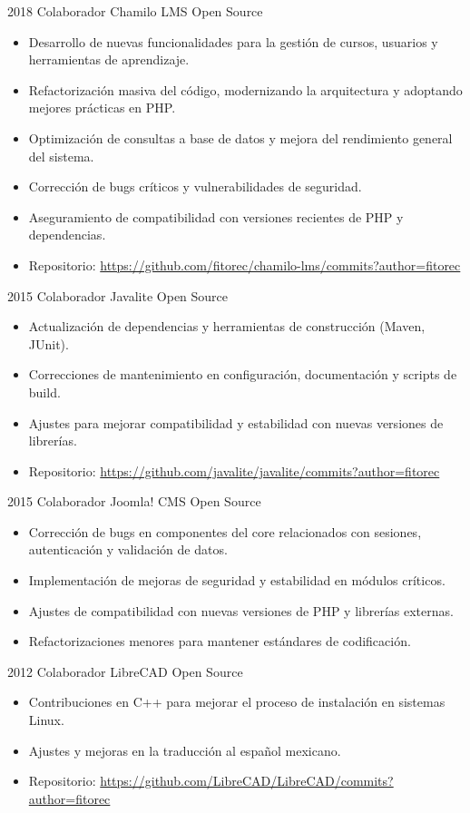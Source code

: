\cventry
{2018}
{Colaborador}
{Chamilo LMS}
{Open Source}
{}
{
\begin{itemize}
  \item Desarrollo de nuevas funcionalidades para la gestión de cursos, usuarios y herramientas de aprendizaje.
  \item Refactorización masiva del código, modernizando la arquitectura y adoptando mejores prácticas en PHP.
  \item Optimización de consultas a base de datos y mejora del rendimiento general del sistema.
  \item Corrección de bugs críticos y vulnerabilidades de seguridad.
  \item Aseguramiento de compatibilidad con versiones recientes de PHP y dependencias.
  \item Repositorio: \url{https://github.com/fitorec/chamilo-lms/commits?author=fitorec}
\end{itemize}
}

\cventry
{2015}
{Colaborador}
{Javalite}
{Open Source}
{}
{
\begin{itemize}
  \item Actualización de dependencias y herramientas de construcción (Maven, JUnit).
  \item Correcciones de mantenimiento en configuración, documentación y scripts de build.
  \item Ajustes para mejorar compatibilidad y estabilidad con nuevas versiones de librerías.
  \item Repositorio: \url{https://github.com/javalite/javalite/commits?author=fitorec}
\end{itemize}
}

\cventry
{2015}
{Colaborador}
{Joomla! CMS}
{Open Source}
{}
{
\begin{itemize}
  \item Corrección de bugs en componentes del core relacionados con sesiones, autenticación y validación de datos.
  \item Implementación de mejoras de seguridad y estabilidad en módulos críticos.
  \item Ajustes de compatibilidad con nuevas versiones de PHP y librerías externas.
  \item Refactorizaciones menores para mantener estándares de codificación.
\end{itemize}
}

\cventry
{2012}
{Colaborador}
{LibreCAD}
{Open Source}
{}
{
\begin{itemize}
  \item Contribuciones en C++ para mejorar el proceso de instalación en sistemas Linux.
  \item Ajustes y mejoras en la traducción al español mexicano.
  \item Repositorio: \url{https://github.com/LibreCAD/LibreCAD/commits?author=fitorec}
\end{itemize}
}

